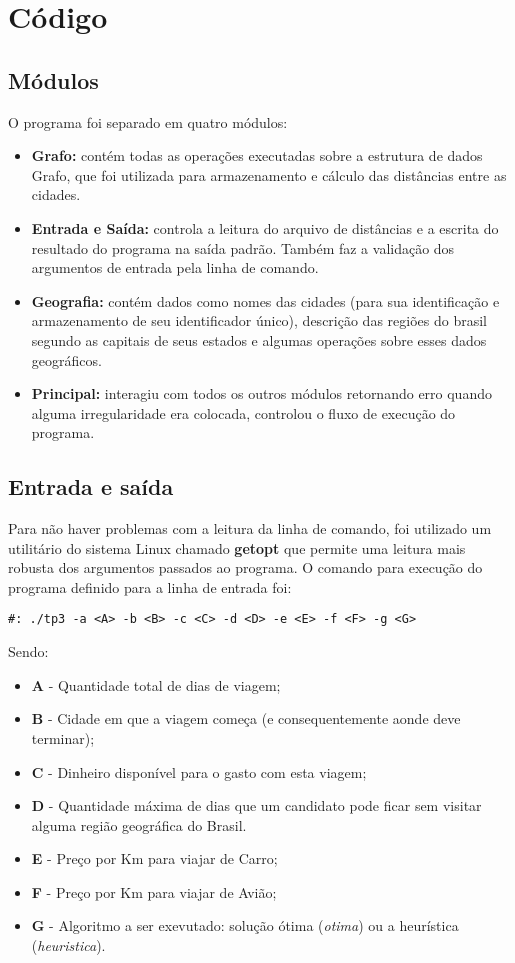 \documentclass[12pt]{article}
\begin{document}
\section{Código}

\subsection{Módulos}
O programa foi separado em quatro módulos:
\begin{itemize}
\item \textbf{Grafo:} contém todas as operações executadas sobre a 
estrutura de dados Grafo, que foi utilizada para armazenamento e cálculo
das distâncias entre as cidades.
\item \textbf{Entrada e Saída:} controla a leitura do arquivo de distâncias
e a escrita do resultado do programa na saída padrão. Também faz a validação dos 
argumentos de entrada pela linha de comando.
\item \textbf{Geografia:} contém dados como nomes das cidades (para sua identificação
e armazenamento de seu identificador único), descrição das regiões do brasil
segundo as capitais de seus estados e algumas operações sobre esses dados geográficos.
\item \textbf{Principal:} interagiu com todos os outros módulos retornando erro
quando alguma irregularidade era colocada, controlou o fluxo de execução do
programa.
\end{itemize}

\subsection{Entrada e saída}
Para não haver problemas com a leitura da linha de comando, foi utilizado um utilitário do
sistema Linux chamado \textbf{getopt} que permite uma leitura mais robusta dos argumentos
passados ao programa. O comando para execução do programa definido para a linha de entrada 
foi:
\begin{verbatim}
#: ./tp3 -a <A> -b <B> -c <C> -d <D> -e <E> -f <F> -g <G> 
\end{verbatim}
Sendo: 
\begin{itemize}
  \item \textbf{A} - Quantidade total de dias de viagem;
  \item \textbf{B} - Cidade em que a viagem começa (e consequentemente aonde deve terminar);
  \item \textbf{C} - Dinheiro disponível para o gasto com esta viagem;
  \item \textbf{D} - Quantidade máxima de dias que um candidato pode ficar sem visitar alguma
  região geográfica do Brasil.
  \item \textbf{E} - Preço por Km para viajar de Carro;
  \item \textbf{F} - Preço por Km para viajar de Avião; 
  \item \textbf{G} - Algoritmo a ser exevutado: solução ótima (\textit{otima}) ou a 
  heurística (\textit{heuristica}).
\end{itemize}
\end{document}
